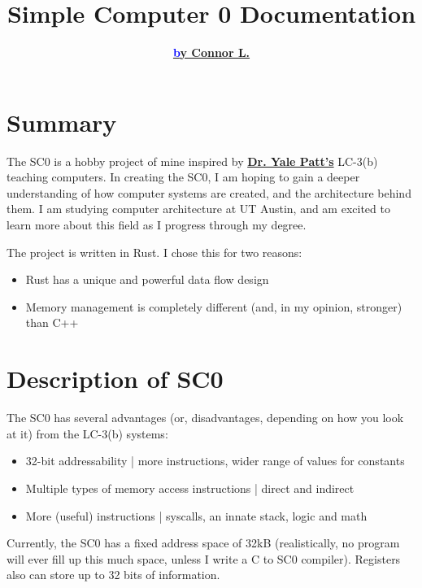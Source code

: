 \documentclass{article}
\begin{document}
\title{\Huge\textbf{Simple Computer 0 Documentation}}
\author{\href{https://github.com/connorl309/}{\textbf{\textcolor{blue}by Connor L.}}}
\date{}
\maketitle

\begin{tableofcontents}
\pagebreak
\section{\Huge Summary}
\begin{Large}
The SC0 is a hobby project of mine inspired by \href{https://users.ece.utexas.edu/~patt/}{\textbf{Dr. Yale Patt's}}
LC-3(b) teaching computers. In creating the SC0, I am hoping to gain a deeper understanding
of how computer systems are created, and the architecture behind them. I am studying computer
architecture at UT Austin, and am excited to learn more about this field as I progress through
my degree.

The project is written in Rust. I chose this for two reasons: 
\begin{itemize}
    \item Rust has a unique and powerful data flow design
    \item Memory management is completely different (and, in my opinion, stronger) than C++
\end{itemize}
\end{Large}

\section{\Huge Description of SC0}
\begin{Large}
The SC0 has several advantages (or, disadvantages, depending on how you look at it) from
the LC-3(b) systems:
\begin{itemize}
    \item 32-bit addressability | more instructions, wider range of values for constants
    \item Multiple types of memory access instructions | direct and indirect
    \item More (useful) instructions | syscalls, an innate stack, logic and math
\end{itemize}
Currently, the SC0 has a fixed address space of 32kB (realistically, no program will ever fill
up this much space, unless I write a C to SC0 compiler). Registers also can store up to 32 bits
of information.


\end{Large}
\end{tableofcontents}
\end{document}
